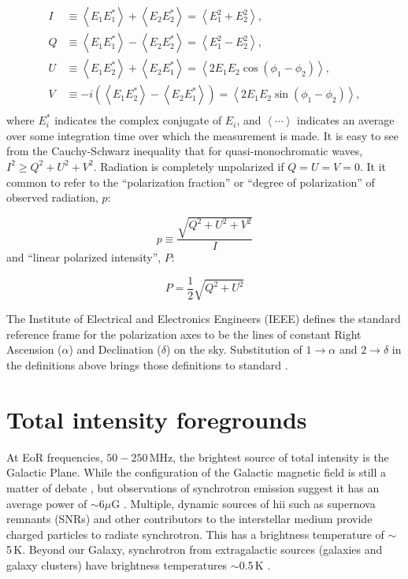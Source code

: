 \begin{align}
I &\equiv  \left\langle E_1E_1^* \right\rangle + \left\langle E_2E_2^* \right\rangle = \left\langle E_1^2 + E_2^2 \right\rangle, \\
Q &\equiv \left\langle E_1E_1^* \right\rangle - \left\langle E_2E_2^* \right\rangle = \left\langle E_1^2 - E_2^2 \right\rangle, \\
U &\equiv \left\langle E_1E_2^* \right\rangle + \left\langle E_2E_1^* \right\rangle = \left\langle 2 E_1 E_2 \cos(\phi_1 - \phi_2)\right\rangle, \\
V &\equiv -i (\left\langle E_1E_2^* \right\rangle - \left\langle E_2E_1^* \right\rangle) = \left\langle 2 E_1 E_2 \sin(\phi_1 - \phi_2)\right\rangle, \\
\end{align}
where $E_i^*$ indicates the complex conjugate of $E_i$, and $\left\langle \cdots \right\rangle$ indicates an average over some integration time over which the measurement is made. It is easy to see from the Cauchy-Schwarz inequality that for quasi-monochromatic waves, $I^2 \geq Q^2 + U^2 + V^2$. Radiation is completely unpolarized if $Q=U=V=0$. It it common to refer to the ``polarization fraction'' or ``degree of polarization'' of observed radiation, $p$:

\begin{equation}
p \equiv \frac{\sqrt{Q^2 + U^2 + V^2}}{I}
\end{equation}
and ``linear polarized intensity'', $P$:

\begin{equation}
P = \frac{1}{2}\sqrt{Q^2 + U^2}
\end{equation}

The Institute of Electrical and Electronics Engineers (IEEE) defines the standard reference frame for the polarization axes to be the lines of constant Right Ascension ($\alpha$) and Declination ($\delta$) on the sky. Substitution of $1\rightarrow\alpha$ and $2\rightarrow\delta$ in the definitions above brings those definitions to standard \citep{Cohen.58, Ludwig.73, vanStraten.10}.

\section{Total intensity foregrounds}

At EoR frequencies, $50 - 250$\,MHz, the brightest source of total intensity is the Galactic Plane. While the configuration of the Galactic magnetic field is still a matter of debate \citep[e.g.][]{Haverkorn.15}, but observations of synchrotron emission suggest it has an average power of $\sim6\mu$G \citep[e.g.][]{Beck.03}. Multiple, dynamic sources of {\sc hii} such as supernova remnants (SNRs) and other contributors to the interstellar medium provide charged particles to radiate synchrotron. This has a brightness temperature of $\sim$5\,K. Beyond our Galaxy, synchrotron from extragalactic sources (galaxies and galaxy clusters) have brightness temperatures $\sim$0.5\,K \citep[e.g.][]{Jelic.10}. 

